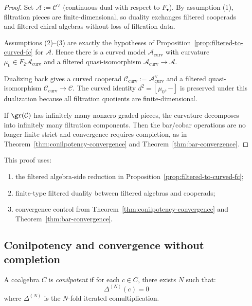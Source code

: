 \begin{proof}
Set $\mathcal{A}:=\mathcal{C}^\vee$ (continuous dual with respect to
$F_\bullet$). By assumption (1), filtration pieces are finite-dimensional, so
duality exchanges filtered cooperads and filtered chiral algebras without loss
of filtration data.

Assumptions (2)--(3) are exactly the hypotheses of
Proposition~\ref{prop:filtered-to-curved-fc} for $\mathcal{A}$. Hence there is a
curved model $\mathcal{A}_{\mathrm{curv}}$ with curvature
$\mu_0\in F_2\mathcal{A}_{\mathrm{curv}}$ and a filtered quasi-isomorphism
$\mathcal{A}_{\mathrm{curv}}\to\mathcal{A}$.

Dualizing back gives a curved cooperad
$\mathcal{C}_{\mathrm{curv}}:=\mathcal{A}_{\mathrm{curv}}^\vee$ and a filtered
quasi-isomorphism $\mathcal{C}_{\mathrm{curv}}\to\mathcal{C}$. The curved identity
$d^2=[\mu_0,-]$ is preserved under this dualization because all filtration
quotients are finite-dimensional.

If $\gr(\mathcal{C})$ has infinitely many nonzero graded pieces, the curvature
decomposes into infinitely many filtration components. Then the bar/cobar
operations are no longer finite strict and convergence requires completion,
as in Theorem~\ref{thm:conilpotency-convergence} and
Theorem~\ref{thm:bar-convergence}.
\end{proof}

\begin{remark}[Dependencies]
This proof uses:
\begin{enumerate}[label=(D\arabic*)]
\item the filtered algebra-side reduction in
Proposition~\ref{prop:filtered-to-curved-fc};
\item finite-type filtered duality between filtered algebras and cooperads;
\item convergence control from Theorem~\ref{thm:conilpotency-convergence} and
Theorem~\ref{thm:bar-convergence}.
\end{enumerate}
\end{remark}

\subsection{Conilpotency and convergence without completion}
\label{sec:conilpotency-convergence}

\begin{definition}
\label{def:conilpotent-complete}
A coalgebra $C$ is \emph{conilpotent} if for each $c \in C$, there exists $N$ such that:
\begin{equation}
\Delta^{(N)}(c) = 0
\end{equation}
where $\Delta^{(N)}$ is the $N$-fold iterated comultiplication.
\end{definition}

